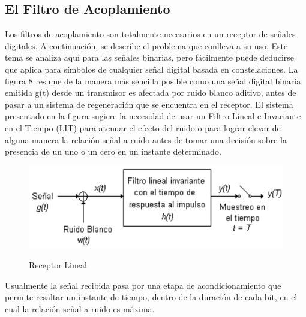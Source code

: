 \subsection{El Filtro de Acoplamiento}
Los filtros de acoplamiento son totalmente necesarios en un receptor de señales digitales. A continuación, se describe el problema que conlleva a su uso. Este tema se analiza aquí para las señales binarias, pero fácilmente puede deducirse que aplica para símbolos de cualquier señal digital basada en constelaciones.  La figura 8 resume de la manera más sencilla posible como una señal digital binaria emitida g(t) desde un transmisor es afectada por ruido blanco aditivo, antes de pasar a un sistema de regeneración que se encuentra en el receptor. El sistema presentado en la figura sugiere la necesidad de usar un Filtro Lineal e Invariante en el Tiempo (LIT) para atenuar el efecto del ruido o para lograr elevar de alguna manera la relación señal a ruido antes de tomar una decisión sobre la presencia de un uno o un cero en un instante determinado. \\

\begin{figure}[h!]
	\captionsetup{justification = raggedright, singlelinecheck = false}
	\caption{Receptor Lineal} 
	\centering
	\includegraphics[scale=1]{Imagenes/Receptor.png}
	\label{fig:Receptor}
\end{figure}

Usualmente la señal recibida pasa por una etapa de acondicionamiento que permite resaltar un instante de tiempo, dentro de la duración de cada bit, en el cual la relación señal a ruido es máxima.\\

